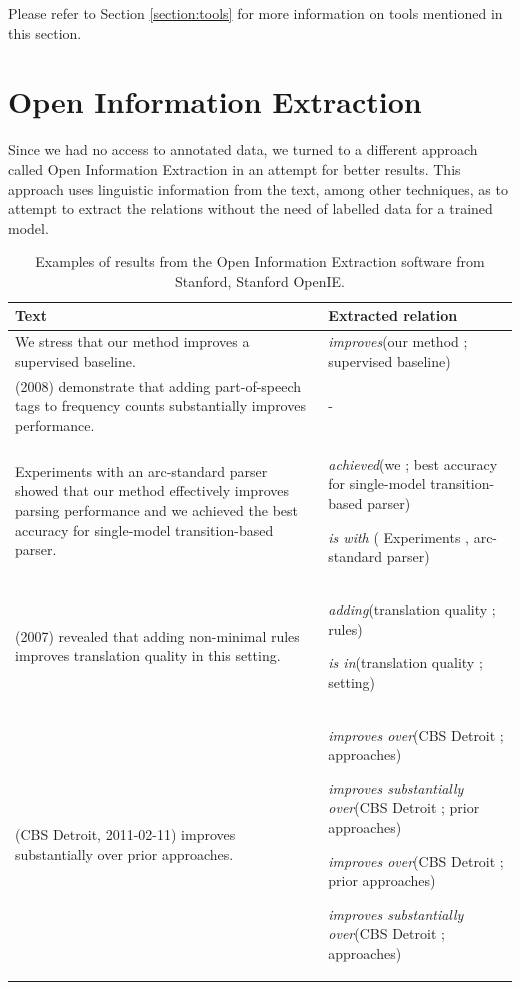 \documentclass[11pt,a4paper,openright]{memoir}
\begin{document}
Please refer to Section \ref{section:tools} for more information on tools mentioned in this section.


%
%
%
%


\section{Open Information Extraction}
\label{section:related}

Since we had no access to annotated data, we turned to a different approach called Open Information Extraction in an attempt for better results. This approach uses linguistic information from the text, among other techniques, as to attempt to extract the relations without the need of labelled data for a trained model.

\begin{table}[!htbp]
  \centering
  \tiny
    \begin{tabular}{|m{6cm}|m{5cm}|}
      \hline
      \textbf{Text}             & \textbf{Extracted relation} \\
      \hline
      We stress that our method improves a supervised baseline.      & \emph{improves}(our method ; supervised baseline)          \\
      \hline
      (2008) demonstrate that adding part-of-speech tags to frequency counts substantially improves performance.
& -          \\
      \hline
      Experiments with an arc-standard parser showed that our method effectively improves parsing performance and we achieved the best accuracy for single-model transition-based parser.
&
\emph{achieved}(we ; best accuracy for single-model transition-based parser)

\emph{is with} ( Experiments , arc-standard parser)\\
      \hline
      (2007) revealed that adding non-minimal rules improves translation quality in this setting.
&
\emph{adding}(translation quality ; rules)

\emph{is in}(translation quality ; setting)
\\
      \hline
      (CBS Detroit, 2011-02-11) improves substantially over prior approaches.
&

\emph{improves over}(CBS Detroit ; approaches)

\emph{improves substantially over}(CBS Detroit ; prior approaches)

\emph{improves over}(CBS Detroit ; prior approaches)

\emph{improves substantially over}(CBS Detroit ; approaches)

\\
      \hline
    \end{tabular}
  \caption[Examples of results from the Open Information Extraction.]{Examples of results from the Open Information Extraction software from Stanford, Stanford OpenIE.}
  \label{tab:extractions_from_open_ie}
\end{table}
\end{document}
